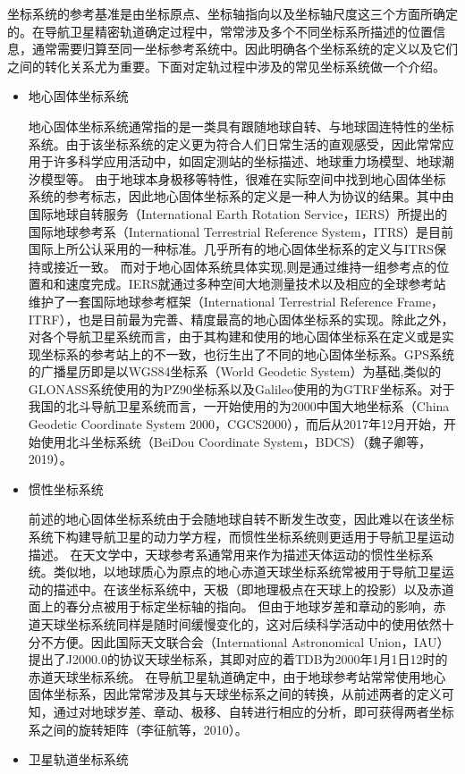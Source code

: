坐标系统的参考基准是由坐标原点、坐标轴指向以及坐标轴尺度这三个方面所确定的。在导航卫星精密轨道确定过程中，常常涉及多个不同坐标系所描述的位置信息，通常需要归算至同一坐标参考系统中。因此明确各个坐标系统的定义以及它们之间的转化关系尤为重要。下面对定轨过程中涉及的常见坐标系统做一个介绍。
\begin{itemize}
    \item 地心固体坐标系统

    地心固体坐标系统通常指的是一类具有跟随地球自转、与地球固连特性的坐标系统。由于该坐标系统的定义更为符合人们日常生活的直观感受，因此常常应用于许多科学应用活动中，如固定测站的坐标描述、地球重力场模型、地球潮汐模型等。
    由于地球本身极移等特性，很难在实际空间中找到地心固体坐标系统的参考标志，因此地心固体坐标系的定义是一种人为协议的结果。其中由国际地球自转服务（International Earth Rotation Service，IERS）所提出的国际地球参考系（International Terrestrial Reference System，ITRS）是目前国际上所公认采用的一种标准。几乎所有的地心固体坐标系的定义与ITRS保持或接近一致。
    而对于地心固体系统具体实现,则是通过维持一组参考点的位置和和速度完成。IERS就通过多种空间大地测量技术以及相应的全球参考站维护了一套国际地球参考框架（International Terrestrial Reference Frame，ITRF），也是目前最为完善、精度最高的地心固体坐标系的实现。除此之外，对各个导航卫星系统而言，由于其构建和使用的地心固体坐标系在定义或是实现坐标系的参考站上的不一致，也衍生出了不同的地心固体坐标系。GPS系统的广播星历即是以WGS84坐标系（World Geodetic System）为基础,类似的GLONASS系统使用的为PZ90坐标系以及Galileo使用的为GTRF坐标系。对于我国的北斗导航卫星系统而言，一开始使用的为2000中国大地坐标系（China Geodetic Coordinate System 2000，CGCS2000），而后从2017年12月开始，开始使用北斗坐标系统（BeiDou Coordinate System，BDCS）（魏子卿等， 2019）。 

    \item 惯性坐标系统

    前述的地心固体坐标系统由于会随地球自转不断发生改变，因此难以在该坐标系统下构建导航卫星的动力学方程，而惯性坐标系统则更适用于导航卫星运动描述。
    在天文学中，天球参考系通常用来作为描述天体运动的惯性坐标系统。类似地，以地球质心为原点的地心赤道天球坐标系统常被用于导航卫星运动的描述中。在该坐标系统中，天极（即地理极点在天球上的投影）以及赤道面上的春分点被用于标定坐标轴的指向。
    但由于地球岁差和章动的影响，赤道天球坐标系统同样是随时间缓慢变化的，这对后续科学活动中的使用依然十分不方便。因此国际天文联合会（International Astronomical Union，IAU）提出了J2000.0的协议天球坐标系，其即对应的着TDB为2000年1月1日12时的赤道天球坐标系统。
    在导航卫星轨道确定中，由于地球参考站常常使用地心固体坐标系，因此常常涉及其与天球坐标系之间的转换，从前述两者的定义可知，通过对地球岁差、章动、极移、自转进行相应的分析，即可获得两者坐标系之间的旋转矩阵（李征航等，2010）。
    \item 卫星轨道坐标系统
    

\end{itemize}
